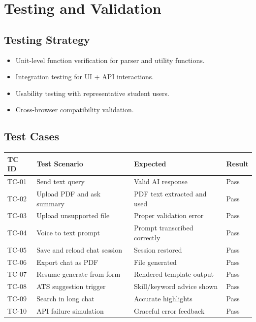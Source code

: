 \documentclass[12pt,a4paper]{report}
\begin{document}
\chapter{Testing and Validation}
\section{Testing Strategy}
\begin{itemize}
  \item Unit-level function verification for parser and utility functions.
  \item Integration testing for UI + API interactions.
  \item Usability testing with representative student users.
  \item Cross-browser compatibility validation.
\end{itemize}

\section{Test Cases}
\begin{longtable}{|p{0.8in}|p{2.2in}|p{1.0in}|p{1.3in}|}
\hline
\textbf{TC ID} & \textbf{Test Scenario} & \textbf{Expected} & \textbf{Result} \\
\hline
TC-01 & Send text query & Valid AI response & Pass \\
\hline
TC-02 & Upload PDF and ask summary & PDF text extracted and used & Pass \\
\hline
TC-03 & Upload unsupported file & Proper validation error & Pass \\
\hline
TC-04 & Voice to text prompt & Prompt transcribed correctly & Pass \\
\hline
TC-05 & Save and reload chat session & Session restored & Pass \\
\hline
TC-06 & Export chat as PDF & File generated & Pass \\
\hline
TC-07 & Resume generate from form & Rendered template output & Pass \\
\hline
TC-08 & ATS suggestion trigger & Skill/keyword advice shown & Pass \\
\hline
TC-09 & Search in long chat & Accurate highlights & Pass \\
\hline
TC-10 & API failure simulation & Graceful error feedback & Pass \\
\hline
\end{longtable}
\end{document}
